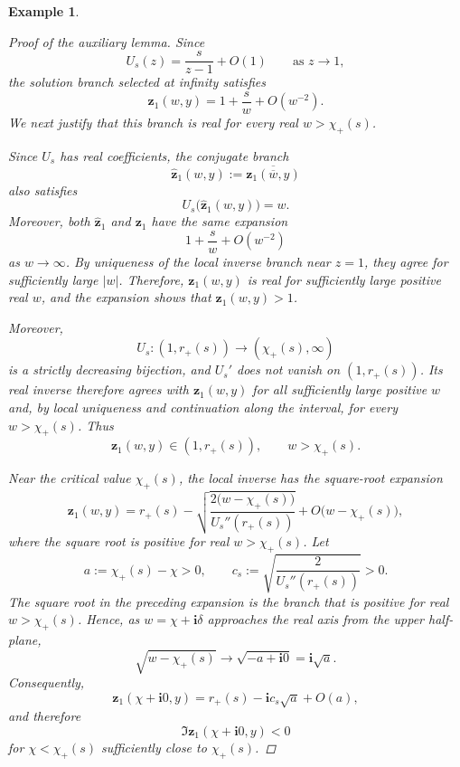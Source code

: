 \documentclass[11pt]{amsart}
\theoremstyle{plain}
\newtheorem{example}[theorem]{Example}
\numberwithin{equation}{section}
\numberwithin{theorem}{section}
\numberwithin{figure}{section}
\begin{document}
\begin{example}
\begin{proof}[Proof of the auxiliary lemma]
Since
\[
    U_s(z)=\frac{s}{z-1}+O(1)
    \qquad\text{as }z\to1,
\]
the solution branch selected at infinity satisfies
\[
    \mathbf z_1(w,y)
    =
    1+\frac{s}{w}+O(w^{-2}).
\]
We next justify that this branch is real for every real
$w>\chi_+(s)$. 

Since \(U_s\) has real coefficients, the conjugate branch
\[
    \widehat{\mathbf z}_1(w,y)
    :=
    \overline{\mathbf z_1(\overline w,y)}
\]
also satisfies
\[
    U_s\bigl(\widehat{\mathbf z}_1(w,y)\bigr)=w.
\]
Moreover, both \(\widehat{\mathbf z}_1\) and \(\mathbf z_1\) have the
same expansion
\[
    1+\frac{s}{w}+O(w^{-2})
\]
as \(w\to\infty\). By uniqueness of the local inverse branch near
\(z=1\), they agree for sufficiently large \(\lvert w\rvert\).
Therefore, \(\mathbf z_1(w,y)\) is real for sufficiently large
positive real \(w\), and the expansion shows that
\(\mathbf z_1(w,y)>1\).

Moreover,
\[
    U_s:(1,r_+(s))\longrightarrow(\chi_+(s),\infty)
\]
is a strictly decreasing bijection, and $U_s'$ does not vanish on
$(1,r_+(s))$. Its real inverse therefore agrees with
$\mathbf z_1(w,y)$ for all sufficiently large positive $w$ and, by
local uniqueness and continuation along the interval, for every
$w>\chi_+(s)$. Thus
\[
    \mathbf z_1(w,y)\in(1,r_+(s)),
    \qquad w>\chi_+(s).
\]

Near the critical value $\chi_+(s)$, the local inverse has the
square-root expansion
\begin{equation}
    \mathbf z_1(w,y)
    =
    r_+(s)
    -
    \sqrt{
        \frac{2\bigl(w-\chi_+(s)\bigr)}
             {U_s''(r_+(s))}
    }
    +
    O\bigl(w-\chi_+(s)\bigr),
\end{equation}
where the square root is positive for real $w>\chi_+(s)$. Let
\[
    a:=\chi_+(s)-\chi>0,
    \qquad
    c_s:=
    \sqrt{\frac{2}{U_s''(r_+(s))}}>0.
\]
The square root in the preceding expansion is the branch that is
positive for real \(w>\chi_+(s)\). Hence, as \(w=\chi+\mathbf i\delta\)
approaches the real axis from the upper half-plane,
\[
    \sqrt{w-\chi_+(s)}
    \longrightarrow
    \sqrt{-a+\mathbf i0}
    =
    \mathbf i\sqrt a.
\]
Consequently,
\[
    \mathbf z_1(\chi+\mathbf i0,y)
    =
    r_+(s)-\mathbf i c_s\sqrt a+O(a),
\]
and therefore
\[
    \Im\mathbf z_1(\chi+\mathbf i0,y)<0
\]
for \(\chi<\chi_+(s)\) sufficiently close to \(\chi_+(s)\).


\end{proof}
\end{example}
\end{document}
